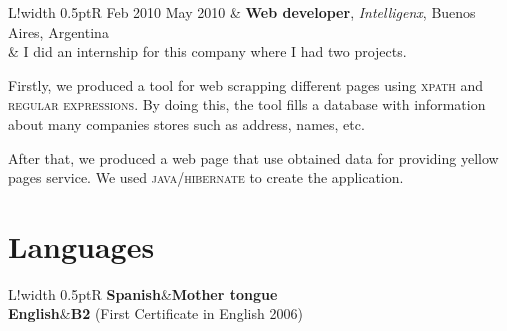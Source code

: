 \documentclass[10pt]{article}
\newcommand\VRule{\color{lightgray}\vrule width 0.5pt}
\begin{document}
\begin{tabular}{L!{\VRule}R}
Feb 2010 May 2010 & \textbf{Web developer}, \textit{Intelligenx}, Buenos 
Aires, Argentina\\
& \vspace{-0.7cm} I did an internship for this company where I had two 
projects.

Firstly, we produced a tool for web scrapping different pages using
\textsc{xpath} and \textsc{regular expressions}. By doing this, the tool fills 
a
database with information about many companies stores such as address, names, 
etc.

After that, we produced a web page that use obtained data for providing yellow 
pages service. We used \textsc{java/hibernate} to create the application. \\
\end{tabular}



\section*{Languages}

\begin{tabular}{L!{\VRule}R}
{\bf Spanish}&{\bf Mother tongue}\\
{\bf English}&{\bf B2} (First Certificate in English 2006)\\
\end{tabular}
\end{document}
